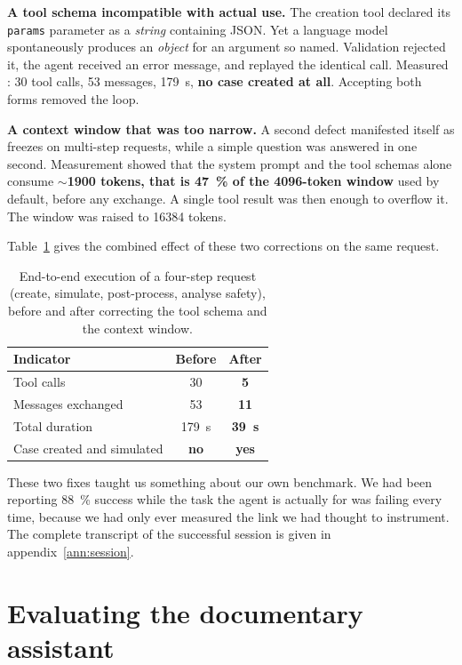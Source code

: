\documentclass[12pt,a4paper]{report}
\begin{document}
\textbf{A tool schema incompatible with actual use.} The creation tool declared
its \texttt{params} parameter as a \emph{string} containing JSON. Yet a language
model spontaneously produces an \emph{object} for an argument so named.
Validation rejected it, the agent received an error message, and replayed the
identical call. Measured : \num{30} tool calls, \num{53} messages,
\SI{179}{\second}, \textbf{no case created at all}. Accepting both forms removed
the loop.

\textbf{A context window that was too narrow.} A second defect manifested itself
as freezes on multi-step requests, while a simple question was answered in one
second. Measurement showed that the system prompt and the tool schemas alone
consume \textbf{$\sim$\num{1900} tokens, that is \SI{47}{\percent} of the
\num{4096}-token window} used by default, before any exchange. A single tool
result was then enough to overflow it. The window was raised to \num{16384}
tokens.

Table~\ref{tab:bout-en-bout} gives the combined effect of these two corrections
on the same request.

\begin{table}[htbp]
\centering
\caption[End-to-end execution]{End-to-end execution of a four-step request
(create, simulate, post-process, analyse safety), before and after correcting
the tool schema and the context window.}
\label{tab:bout-en-bout}
\begin{tabularx}{0.92\textwidth}{@{}Xcc@{}}
\toprule
\textbf{Indicator} & \textbf{Before} & \textbf{After}\\
\midrule
Tool calls & \num{30} & \textbf{\num{5}}\\
Messages exchanged & \num{53} & \textbf{\num{11}}\\
Total duration & \SI{179}{\second} & \textbf{\SI{39}{\second}}\\
Case created and simulated & \textcolor{cAlert}{\textbf{no}} & \textbf{yes}\\
\bottomrule
\end{tabularx}
\end{table}

These two fixes taught us something about our own benchmark. We had been
reporting \SI{88}{\percent} success while the task the agent is actually for was
failing every time, because we had only ever measured the link we had thought to
instrument. The complete transcript of
the successful session is given in appendix~\ref{ann:session}.

\section{Evaluating the documentary assistant}
\label{sec:rag}
\end{document}

